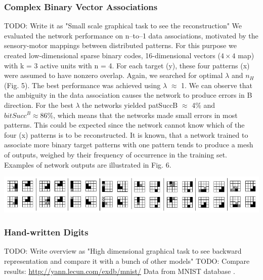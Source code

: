 \subsubsection{Complex Binary Vector Associations} 

TODO: Write it as "Small scale graphical task to see the reconstruction" 
We evaluated the network performance on n–to–1 data associations, motivated
by the sensory-motor mappings between distributed patterns. For this purpose
we created low-dimensional sparse binary codes, 16-dimensional vectors ($4 \times 4$
map) with k = 3 active units with n = 4. For each target (y), these four
patterns (x) were assumed to have nonzero overlap. Again, we searched for
optimal $\lambda$ and $n_H$ (Fig. 5). The best performance was achieved using $\lambda$ $\approx$ 1. We
can observe that the ambiguity in the data association causes the network to
produce errors in B direction. For the best $\lambda$ the networks yielded patSuccB $\approx$
4\% and $bitSucc^B \approx 86\%$, which means that the networks made small errors in
most patterns. This could be expected since the network cannot know which of
the four (x) patterns is to be reconstructed. It is known, that a network trained
to associate more binary target patterns with one pattern tends to produce a
mesh of outputs, weighed by their frequency of occurrence in the training set.
Examples of network outputs are illustrated in Fig. 6.

\begin{center} 
\includegraphics{img/cbva_back_repre.png} 
\end{center} 

\subsubsection{Hand-written Digits} 
TODO: Write overview as "High dimensional graphical task to see backward representation and compare it with a bunch of other models" 
TODO: Compare results: \url{http://yann.lecun.com/exdb/mnist/} 
Data from MNIST database \cite{lecun1998gradient}. 



